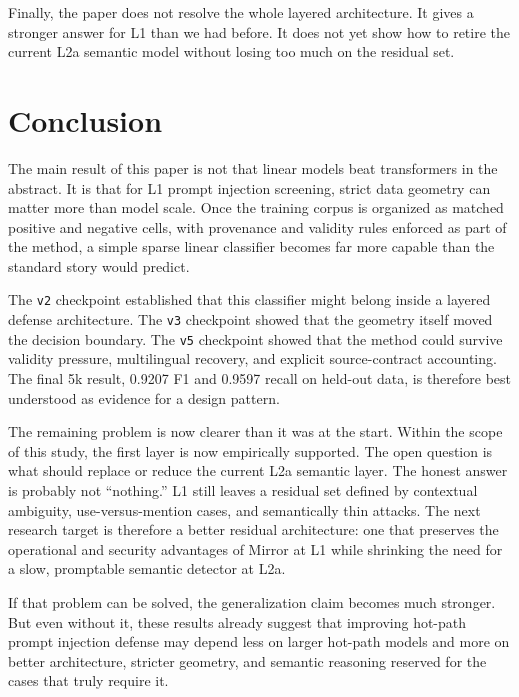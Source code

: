 \documentclass[11pt,a4paper]{article}
\begin{document}
Finally, the paper does not resolve the whole layered architecture. It
gives a stronger answer for L1 than we had before. It does not yet show
how to retire the current L2a semantic model without losing too much on
the residual set.

\section{Conclusion}
\label{sec:conclusion}

The main result of this paper is not that linear models beat
transformers in the abstract. It is that for L1 prompt injection
screening, strict data geometry can matter more than model scale. Once
the training corpus is organized as matched positive and negative cells,
with provenance and validity rules enforced as part of the method, a
simple sparse linear classifier becomes far more capable than the
standard story would predict.

The \texttt{v2} checkpoint established that this classifier might belong
inside a layered defense architecture. The \texttt{v3} checkpoint showed
that the geometry itself moved the decision boundary. The \texttt{v5}
checkpoint showed that the method could survive validity pressure,
multilingual recovery, and explicit source-contract accounting. The
final 5k result, 0.9207 F1 and 0.9597 recall on held-out data, is
therefore best understood as evidence for a design pattern.

The remaining problem is now clearer than it was at the start. Within
the scope of this study, the first layer is now empirically supported.
The open question is what should replace or reduce the current L2a
semantic layer. The honest answer is probably not ``nothing.'' L1 still
leaves a residual set defined by contextual ambiguity,
use-versus-mention cases, and semantically thin attacks. The next
research target is therefore a better residual architecture: one that
preserves the operational and security advantages of Mirror at L1 while
shrinking the need for a slow, promptable semantic detector at L2a.

If that problem can be solved, the generalization claim becomes much
stronger. But even without it, these results already suggest that
improving hot-path prompt injection defense may depend less on larger
hot-path models and more on better architecture, stricter geometry, and
semantic reasoning reserved for the cases that truly require it.
\end{document}
